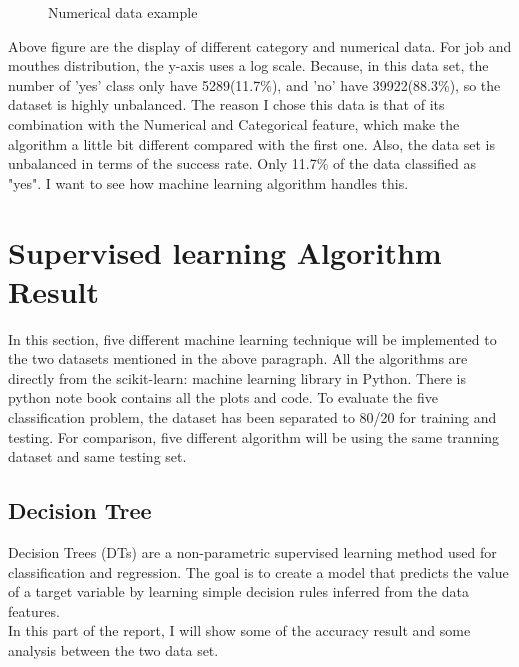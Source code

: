 \documentclass[10pt, conference, compsocconf]{IEEEtran}
\begin{document}
\begin{figure}[h]
	\hfill
	\centering
	\hfill
	\hfill
	\caption{Numerical data example}
	\label{fig:4}
	
\end{figure}

Above figure are the display of different category and numerical data. For job and mouthes distribution, the y-axis uses a log scale. Because, in this data set, the number of 'yes' class only have 5289(11.7\%), and  'no' have 39922(88.3\%), so the dataset is highly unbalanced.
The reason I chose this data is that of its combination with the Numerical and Categorical feature, which make the algorithm a little bit different compared with the first one. Also, the data set is unbalanced in terms of the success rate. Only 11.7\% of the data classified as "yes". I want to see how machine learning algorithm handles this.

\section{Supervised learning Algorithm Result}
In this section, five different machine learning technique will be implemented to the two datasets mentioned in the above paragraph. All the algorithms are directly from the scikit-learn: machine learning library in Python. There is python note book contains all the plots and code. 
To evaluate the five classification problem, the dataset has been separated to 80/20 for training and testing. For comparison, five different algorithm will be using the same tranning dataset and same testing set. 
\subsection{Decision Tree}
Decision Trees (DTs) are a non-parametric supervised learning method used for classification and regression. The goal is to create a model that predicts the value of a target variable by learning simple decision rules inferred from the data features.\\
In this part of the report, I will show some of the accuracy result and some analysis between the two data set. 
\end{document}
